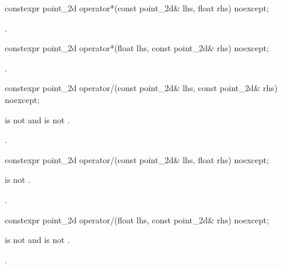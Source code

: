 %
\begin{itemdecl}
constexpr point_2d operator*(const point_2d& lhs, float rhs) noexcept;
\end{itemdecl}
\begin{itemdescr}
\pnum
\returns
{}.
\end{itemdescr}

%
\begin{itemdecl}
constexpr point_2d operator*(float lhs, const point_2d& rhs) noexcept;
\end{itemdecl}
\begin{itemdescr}
\pnum
\returns
{}.
\end{itemdescr}

%
\begin{itemdecl}
constexpr point_2d operator/(const point_2d& lhs, const point_2d& rhs) 
  noexcept;
\end{itemdecl}
\begin{itemdescr}
\pnum
\requires
{} is not  and  is not .

\pnum
\returns
{}.
\end{itemdescr}

%
\begin{itemdecl}
constexpr point_2d operator/(const point_2d& lhs, float rhs) noexcept;
\end{itemdecl}
\begin{itemdescr}
\pnum
\requires
{} is not .

\pnum
\returns
{}.
\end{itemdescr}

%
\begin{itemdecl}
constexpr point_2d operator/(float lhs, const point_2d& rhs) noexcept;
\end{itemdecl}
\begin{itemdescr}
\pnum
\requires
{} is not  and  is not .

\pnum
\returns
{}.
\end{itemdescr}
